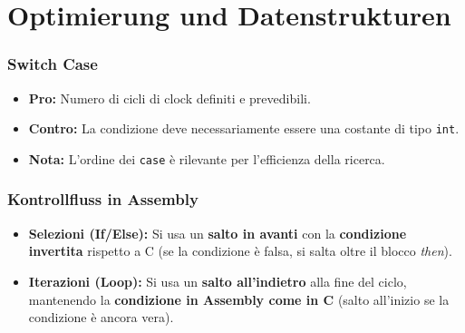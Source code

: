 \section{Optimierung und Datenstrukturen}

\subsubsection{Switch Case}
\begin{itemize}
    \item \textbf{Pro:} Numero di cicli di clock definiti e prevedibili.
    \item \textbf{Contro:} La condizione deve necessariamente essere una costante di tipo \texttt{int}.
    \item \textbf{Nota:} L'ordine dei \texttt{case} è rilevante per l'efficienza della ricerca.
\end{itemize}

\subsubsection{Kontrollfluss in Assembly}
\begin{itemize}
    \item \textbf{Selezioni (If/Else):} Si usa un \textbf{salto in avanti} con la \textbf{condizione invertita} rispetto a C (se la condizione è falsa, si salta oltre il blocco \textit{then}).
    \item \textbf{Iterazioni (Loop):} Si usa un \textbf{salto all'indietro} alla fine del ciclo, mantenendo la \textbf{condizione in Assembly come in C} (salto all'inizio se la condizione è ancora vera).
\end{itemize}


